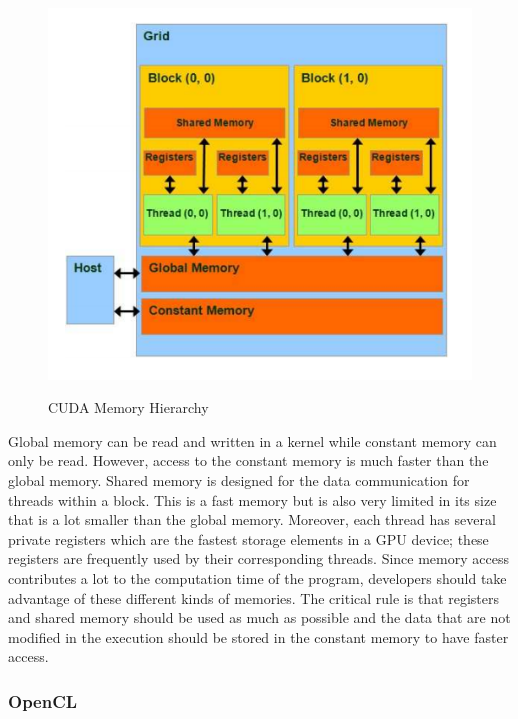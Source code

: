 \documentclass[Ingles]{ic-tese-v1}
\begin{document}
\begin{figure}[t]
	\caption{CUDA Memory Hierarchy}
	\centering
	\includegraphics[scale=0.70]{images/cuda_memory.png}
	\label{fig:cudamemory}
\end{figure}

Global memory can be read and written in a kernel while constant memory can only be
read. However, access to the constant memory is much faster than the global memory. Shared memory is designed for the data communication for
threads within a block. This is a fast memory but is also very limited in its size that is a lot smaller than the global memory. Moreover, each thread has several private registers which are the fastest storage elements in a GPU device; these registers are frequently used by their corresponding threads. Since memory access contributes a lot to the computation time of the program, developers should take advantage of these different kinds of memories. The critical rule is that registers and shared memory should be used as much as possible and the data that are not modified in the execution should be stored in the constant memory to have faster access.

\subsubsection{OpenCL}
\end{document}
